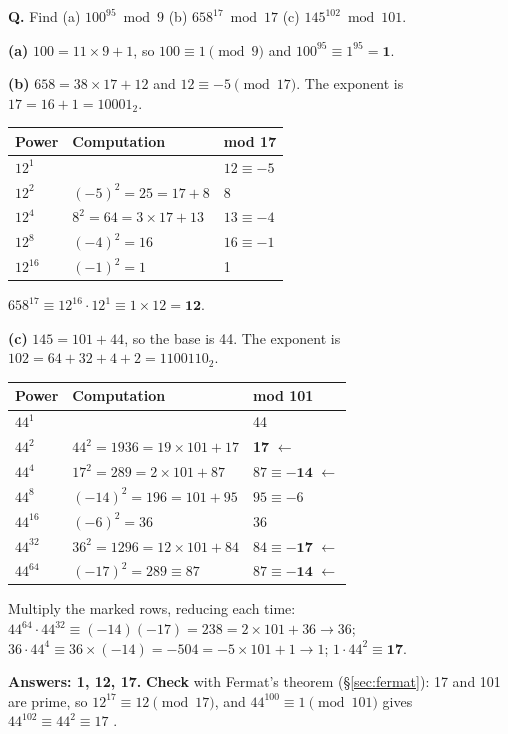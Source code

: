 \begin{worked}
\textbf{Q.} Find (a) $100^{95} \bmod 9$ \quad (b) $658^{17} \bmod 17$ \quad (c) $145^{102} \bmod 101$.

\textbf{(a)} $100 = 11 \times 9 + 1$, so $100 \equiv 1 \pmod 9$ and $100^{95} \equiv 1^{95} = \mathbf{1}$.

\textbf{(b)} $658 = 38 \times 17 + 12$ and $12 \equiv -5 \pmod{17}$. The exponent is $17 = 16 + 1 = 10001_2$.
\begin{center}\small
\begin{tabular}{@{}lll@{}}
\toprule
Power & Computation & mod 17\\
\midrule
$12^1$ & & $12 \equiv -5$\\
$12^2$ & $(-5)^2 = 25 = 17 + 8$ & 8\\
$12^4$ & $8^2 = 64 = 3 \times 17 + 13$ & $13 \equiv -4$\\
$12^8$ & $(-4)^2 = 16$ & $16 \equiv -1$\\
$12^{16}$ & $(-1)^2 = 1$ & 1\\
\bottomrule
\end{tabular}
\end{center}
$658^{17} \equiv 12^{16} \cdot 12^1 \equiv 1 \times 12 = \mathbf{12}$.

\textbf{(c)} $145 = 101 + 44$, so the base is 44. The exponent is $102 = 64 + 32 + 4 + 2 = 1100110_2$.
\begin{center}\small
\begin{tabular}{@{}lll@{}}
\toprule
Power & Computation & mod 101\\
\midrule
$44^1$ & & 44\\
$44^2$ & $44^2 = 1936 = 19 \times 101 + 17$ & \textbf{17} $\leftarrow$\\
$44^4$ & $17^2 = 289 = 2 \times 101 + 87$ & $87 \equiv \mathbf{-14}$ $\leftarrow$\\
$44^8$ & $(-14)^2 = 196 = 101 + 95$ & $95 \equiv -6$\\
$44^{16}$ & $(-6)^2 = 36$ & 36\\
$44^{32}$ & $36^2 = 1296 = 12 \times 101 + 84$ & $84 \equiv \mathbf{-17}$ $\leftarrow$\\
$44^{64}$ & $(-17)^2 = 289 \equiv 87$ & $87 \equiv \mathbf{-14}$ $\leftarrow$\\
\bottomrule
\end{tabular}
\end{center}
Multiply the marked rows, reducing each time: $44^{64} \cdot 44^{32} \equiv (-14)(-17) = 238 = 2 \times 101 + 36 \to 36$; \;$36 \cdot 44^4 \equiv 36 \times (-14) = -504 = -5 \times 101 + 1 \to 1$; \;$1 \cdot 44^2 \equiv \mathbf{17}$.

\textbf{Answers: 1, 12, 17.} \textbf{Check} with Fermat's theorem (\S\ref{sec:fermat}): 17 and 101 are prime, so $12^{17} \equiv 12 \pmod{17}$, and $44^{100} \equiv 1 \pmod{101}$ gives $44^{102} \equiv 44^2 \equiv 17$ \checkmark.
\end{worked}


